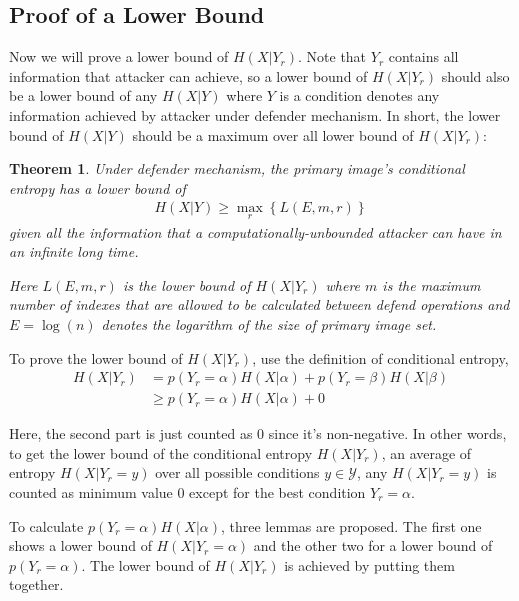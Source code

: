 \documentclass[10pt, conference, compsocconf]{IEEEtran}
\newtheorem{mytheorem}{Theorem}
\begin{document}
    \subsection{Proof of a Lower Bound}
    	Now we will prove a lower bound of $H(X | Y_r)$.
    	Note that $Y_r$ contains all information that attacker can achieve,
    	so a lower bound of $H(X | Y_r)$ should also be a lower
    	bound of any $H(X | Y)$ where $Y$ is a condition denotes any
    	information achieved by attacker under defender mechanism.
    	In short, the lower bound of $H(X|Y)$ should be a maximum over
    	all lower bound of $H(X | Y_r)$:
		\begin{mytheorem}\label{thm1}
            Under defender mechanism,
            the primary image's conditional entropy has a lower bound of
            \begin{align*}
                H(X | Y) \geq \max_{r} \left\{ L(E, m, r) \right\}
            \end{align*}
            given all the information
            that a computationally-unbounded attacker can
            have in an infinite long time. 
            
            Here $L(E, m, r)$ is the lower bound of $H(X | Y_r)$
            where $m$ is
            the maximum number of indexes that are allowed to be calculated
            between defend operations and $E = \log(n)$ denotes the
            logarithm of the size of primary image set.
        \end{mytheorem}

    	
        To prove the lower bound of $H(X | Y_r)$, use the definition of conditional entropy,
        \begin{align*}
            H(X|Y_r) &= p(Y_r = \alpha) H(X | \alpha) + p(Y_r = \beta) H(X | \beta)\\
                &\geq p(Y_r = \alpha) H(X | \alpha) + 0
        \end{align*}
        
        Here, the second part is just counted as $0$ since it's non-negative.
        In other words, to get the lower bound of the conditional entropy $H(X | Y_r)$,
        an average of entropy $H(X | Y_r = y)$ over all possible conditions $y \in \mathcal Y$, 
        any $H(X | Y_r = y)$ is counted as minimum value $0$ except for the best condition
        $Y_r = \alpha$.

        To calculate $p(Y_r = \alpha) H(X | \alpha)$, three lemmas are proposed.
        The first one shows a lower bound of $H(X | Y_r = \alpha)$
        and the other two for a lower bound of $p(Y_r = \alpha)$.
        The lower bound of $H(X | Y_r)$ is achieved by putting
        them together.
\end{document}
